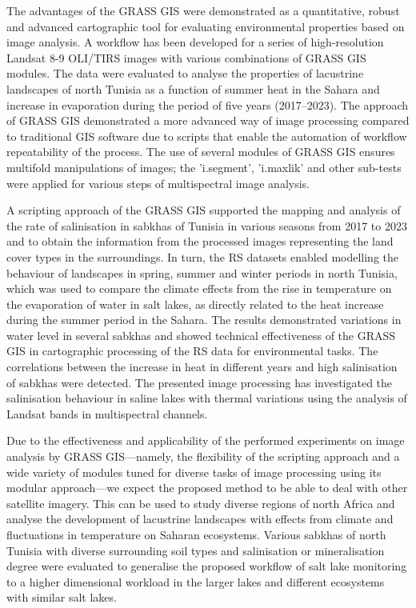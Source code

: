 \documentclass[land,article,accept,pdftex,moreauthors]{Definitions/mdpi}
\begin{document}
{The} advantages of the GRASS GIS {were demonstrated }as a quantitative, robust and advanced cartographic tool for evaluating environmental properties based on image analysis. A workflow has been developed {for} a series of high-resolution Landsat 8-9 OLI/TIRS images with various combinations of GRASS GIS modules{. The data were }evaluated to analyse the properties of lacustrine landscapes of north Tunisia as a function of summer heat in the Sahara and increase in evaporation during the period of {five} years ({2017}--2023). The approach of GRASS GIS demonstrated {a }more advanced way of image processing compared to traditional GIS software due to scripts that enable the automation of workflow repeatability of the process. {The} use of several modules of GRASS GIS ensures multifold manipulations of images; {the} 'i.segment', 'i.maxlik' and other sub-tests{ were} applied for various steps of multispectral image analysis. 

A scripting approach of the GRASS GIS {supported the mapping and analysis of the} rate of salinisation in sabkhas of Tunisia {in} various seasons from {2017} to 2023 and to obtain the information from the processed images representing the land cover types in the surroundings. In turn, {the }RS datasets enabled modelling the behaviour of landscapes in spring, summer and winter periods in north Tunisia, which was used to compare the climate effects from the rise in temperature on the evaporation of water in salt lakes, as directly related to the heat increase during {the }summer period in the Sahara. The results demonstrated variations in water level in several sabkhas and showed technical effectiveness of the GRASS GIS in cartographic processing of the RS data for environmental tasks. {The }correlations between the increase in heat in {different} years and high salinisation of sabkhas were detected. The {presented }image processing {has} investigated the salinisation behaviour in saline lakes with thermal variations using {the }analysis of Landsat bands in multispectral channels. 

Due to the effectiveness and applicability of the performed experiments on image analysis by GRASS GIS---namely, the flexibility of the scripting approach and a wide variety of modules tuned for diverse tasks of image processing using its modular approach---we expect the proposed method to be able to deal with other satellite imagery{. This can be used to study} diverse regions of north Africa {and analyse the }development of lacustrine landscapes with effects from climate and fluctuations in temperature on Saharan ecosystems. Various sabkhas of north Tunisia with diverse surrounding soil types and salinisation {or} mineralisation degree were evaluated to generalise the proposed workflow of salt lake monitoring to a higher dimensional workload in the larger lakes and different{ }ecosystems with similar salt lakes. 
\end{document}
